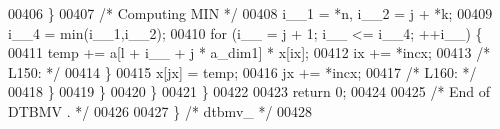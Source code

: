 \begin{DoxyCode}
00406             \}
00407 \textcolor{comment}{/* Computing MIN */}
00408             i\_\_1 = *n, i\_\_2 = j + *k;
00409             i\_\_4 = min(i\_\_1,i\_\_2);
00410             \textcolor{keywordflow}{for} (i\_\_ = j + 1; i\_\_ <= i\_\_4; ++i\_\_) \{
00411             temp += a[l + i\_\_ + j * a\_dim1] * x[ix];
00412             ix += *incx;
00413 \textcolor{comment}{/* L150: */}
00414             \}
00415             x[jx] = temp;
00416             jx += *incx;
00417 \textcolor{comment}{/* L160: */}
00418         \}
00419         \}
00420     \}
00421     \}
00422 
00423     \textcolor{keywordflow}{return} 0;
00424 
00425 \textcolor{comment}{/*     End of DTBMV . */}
00426 
00427 \} \textcolor{comment}{/* dtbmv\_ */}
00428 
\end{DoxyCode}
